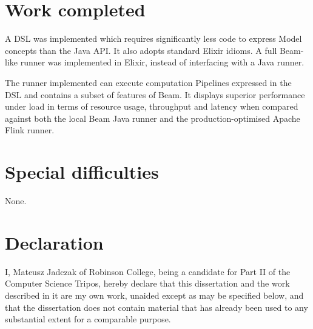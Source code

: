 {\section*{Work completed}

A DSL was implemented which requires significantly less code to express Model concepts than the Java API.
It also adopts standard Elixir idioms.
A full Beam-like runner was implemented in Elixir, instead of interfacing with a Java runner.

The runner implemented can execute computation Pipelines expressed in the DSL and contains a subset of features of Beam.
It displays superior performance under load in terms of resource usage, throughput and latency when compared against both the local Beam Java runner and the production-optimised Apache Flink runner.

\section*{Special difficulties}

None.

\section*{Declaration}

I, Mateusz Jadczak of Robinson College, being a candidate for Part II of the Computer Science Tripos, hereby declare that this dissertation and the work described in it are my own work, unaided except as may be specified below, and that the dissertation does not contain material that has already been used to any substantial extent for a comparable purpose. 

\bigskip
{}

\medskip
{}


\tableofcontents
\listoffigures
\listoflistings
\listoftables
} %
